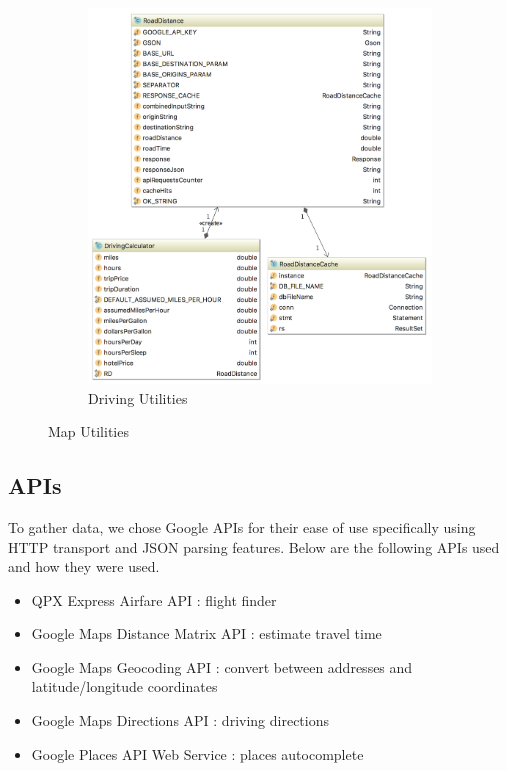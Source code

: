 \documentclass[11pt]{article}
\begin{document}
\begin{figure}
\begin{subfigure}{.6\textwidth}
\centering
  \includegraphics[width=1.1\linewidth]{driveuml}
  \caption{Driving Utilities}
  \label{fig:drivuml}
\end{subfigure}
\caption{Map Utilities}
\label{fig:util}
\end{figure}

\subsection{APIs}

To gather data, we chose Google APIs for their ease of use specifically using HTTP transport and JSON parsing features. 
Below are the following APIs used and how they were used.

\begin{itemize}
\item QPX Express Airfare API : flight finder
\item Google Maps Distance Matrix API : estimate travel time
\item Google Maps Geocoding API : convert between addresses and latitude/longitude coordinates
\item Google Maps Directions API : driving directions
\item Google Places API Web Service : places autocomplete
\end{itemize}
\end{document}
